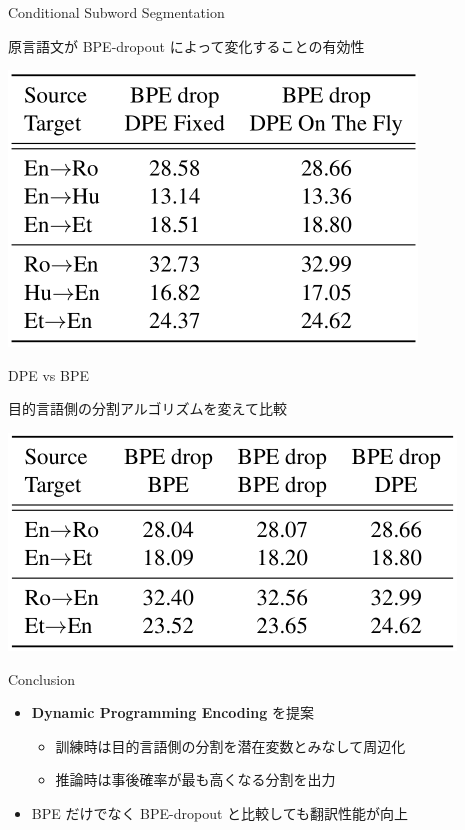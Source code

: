 \documentclass[unicode, 12pt, aspectratio=43]{beamer}
\begin{document}
\begin{frame}[label={sec:orge9c4dc3}]{Conditional Subword Segmentation}
\begin{block}{\small 原言語文が BPE-dropout によって変化することの有効性}
\begin{center}
\includegraphics[width=0.5\linewidth]{./figure/Table6.pdf}
\end{center}
\end{block}
\end{frame}

\begin{frame}[label={sec:org8b33e17}]{DPE vs BPE}
\begin{block}{目的言語側の分割アルゴリズムを変えて比較}
\begin{center}
\includegraphics[width=0.5\linewidth]{./figure/Table7.pdf}
\end{center}
\end{block}
\end{frame}

\begin{frame}[label={sec:org09324f5}]{Conclusion}
\begin{itemize}
\item \textbf{Dynamic Programming Encoding} を提案
\begin{itemize}
\item 訓練時は目的言語側の分割を潜在変数とみなして周辺化
\item 推論時は事後確率が最も高くなる分割を出力
\end{itemize}
\item BPE だけでなく BPE-dropout と比較しても翻訳性能が向上
\end{itemize}
\end{frame}
\end{document}
